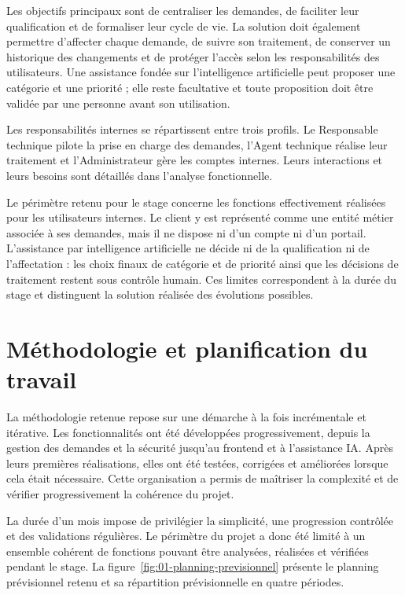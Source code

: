 Les objectifs principaux sont de centraliser les demandes, de faciliter leur qualification et de formaliser leur cycle de vie. La solution doit également permettre d'affecter chaque demande, de suivre son traitement, de conserver un historique des changements et de protéger l'accès selon les responsabilités des utilisateurs. Une assistance fondée sur l'intelligence artificielle peut proposer une catégorie et une priorité ; elle reste facultative et toute proposition doit être validée par une personne avant son utilisation.

Les responsabilités internes se répartissent entre trois profils. Le Responsable technique pilote la prise en charge des demandes, l'Agent technique réalise leur traitement et l'Administrateur gère les comptes internes. Leurs interactions et leurs besoins sont détaillés dans l'analyse fonctionnelle.

Le périmètre retenu pour le stage concerne les fonctions effectivement réalisées pour les utilisateurs internes. Le client y est représenté comme une entité métier associée à ses demandes, mais il ne dispose ni d'un compte ni d'un portail. L'assistance par intelligence artificielle ne décide ni de la qualification ni de l'affectation : les choix finaux de catégorie et de priorité ainsi que les décisions de traitement restent sous contrôle humain. Ces limites correspondent à la durée du stage et distinguent la solution réalisée des évolutions possibles.

\section{Méthodologie et planification du travail}
\label{sec:01-methodologie-planification}

La méthodologie retenue repose sur une démarche à la fois incrémentale et itérative. Les fonctionnalités ont été développées progressivement, depuis la gestion des demandes et la sécurité jusqu'au frontend et à l'assistance IA. Après leurs premières réalisations, elles ont été testées, corrigées et améliorées lorsque cela était nécessaire. Cette organisation a permis de maîtriser la complexité et de vérifier progressivement la cohérence du projet.

La durée d'un mois impose de privilégier la simplicité, une progression contrôlée et des validations régulières. Le périmètre du projet a donc été limité à un ensemble cohérent de fonctions pouvant être analysées, réalisées et vérifiées pendant le stage. La figure~\ref{fig:01-planning-previsionnel} présente le planning prévisionnel retenu et sa répartition prévisionnelle en quatre périodes.

